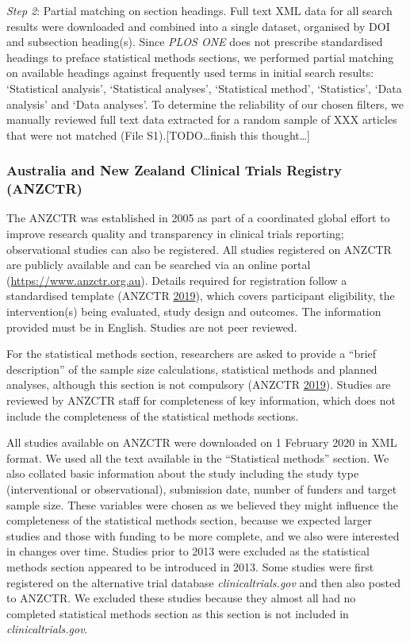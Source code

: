 \documentclass[
]{article}
\begin{document}
\emph{Step 2}: Partial matching on section headings. Full text XML data for all search results were downloaded and combined into a single dataset, organised by DOI and subsection heading(s). Since \emph{PLOS ONE} does not prescribe standardised headings to preface statistical methods sections, we performed partial matching on available headings against frequently used terms in initial search results: `Statistical analysis', `Statistical analyses', `Statistical method', `Statistics', `Data analysis' and `Data analyses'. To determine the reliability of our chosen filters, we manually reviewed full text data extracted for a random sample of XXX articles that were not matched (File S1).{[}TODO\ldots finish this thought\ldots{]}

\hypertarget{australia-and-new-zealand-clinical-trials-registry-anzctr}{%
\subsubsection{Australia and New Zealand Clinical Trials Registry (ANZCTR)}\label{australia-and-new-zealand-clinical-trials-registry-anzctr}}

The ANZCTR was established in 2005 as part of a coordinated global effort to improve research quality and transparency in clinical trials reporting; observational studies can also be registered. All studies registered on ANZCTR are publicly available and can be searched via an online portal (\url{https://www.anzctr.org.au}).
Details required for registration follow a standardised template (ANZCTR \protect\hyperlink{ref-ANZCTR}{2019}), which covers participant eligibility, the intervention(s) being evaluated, study design and outcomes. The information provided must be in English. Studies are not peer reviewed.

For the statistical methods section, researchers are asked to provide a ``brief description'' of the sample size calculations, statistical methods and planned analyses, although this section is not compulsory (ANZCTR \protect\hyperlink{ref-ANZCTR}{2019}). Studies are reviewed by ANZCTR staff for completeness of key information, which does not include the completeness of the statistical methods sections.

All studies available on ANZCTR were downloaded on 1 February 2020 in XML format.
We used all the text available in the ``Statistical methods'' section. We also collated basic information about the study including the study type (interventional or observational), submission date, number of funders and target sample size. These variables were chosen as we believed they might influence the completeness of the statistical methods section, because we expected larger studies and those with funding to be more complete, and we also were interested in changes over time.
Studies prior to 2013 were excluded as the statistical methods section appeared to be introduced in 2013.
Some studies were first registered on the alternative trial database \emph{clinicaltrials.gov} and then also posted to ANZCTR. We excluded these studies because they almost all had no completed statistical methods section as this section is not included in \emph{clinicaltrials.gov}.
\end{document}

